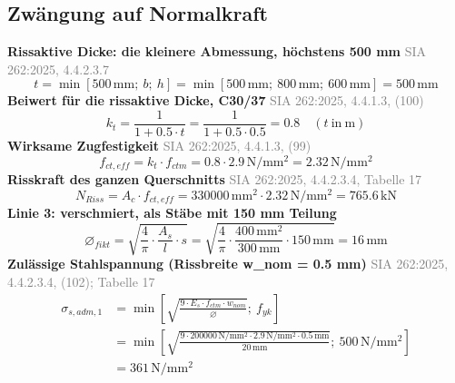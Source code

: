 \documentclass[11pt,a4paper]{article}
\newcommand{\normref}[1]{{\small\textcolor{gray}{#1}}}
\begin{document}
\subsection{Zwängung auf Normalkraft}
\noindent\textbf{Rissaktive Dicke: die kleinere Abmessung, höchstens 500 mm} \hfill \normref{SIA 262:2025, 4.4.2.3.7}
\begin{equation*}
t = \min\left[500\,\mathrm{mm};\ b;\ h\right] = \min\left[500\,\mathrm{mm};\ 800\,\mathrm{mm};\ 600\,\mathrm{mm}\right] = 500\,\mathrm{mm}
\end{equation*}
\noindent\textbf{Beiwert für die rissaktive Dicke, C30/37} \hfill \normref{SIA 262:2025, 4.4.1.3, (100)}
\begin{equation*}
k_t = \frac{1}{1 + 0.5 \cdot t} = \frac{1}{1 + 0.5 \cdot 0.5} = 0.8 \quad \left(t\ \text{in}\ \mathrm{m}\right)
\end{equation*}
\noindent\textbf{Wirksame Zugfestigkeit} \hfill \normref{SIA 262:2025, 4.4.1.3, (99)}
\begin{equation*}
f_{ct,eff} = k_t \cdot f_{ctm} = 0.8 \cdot 2.9\,\mathrm{N}/\mathrm{mm}^{2} = 2.32\,\mathrm{N}/\mathrm{mm}^{2}
\end{equation*}
\noindent\textbf{Risskraft des ganzen Querschnitts} \hfill \normref{SIA 262:2025, 4.4.2.3.4, Tabelle 17}
\begin{equation*}
N_{Riss} = A_c \cdot f_{ct,eff} = 330000\,\mathrm{mm}^{2} \cdot 2.32\,\mathrm{N}/\mathrm{mm}^{2} = 765.6\,\mathrm{kN}
\end{equation*}
\noindent\textbf{Linie 3: verschmiert, als Stäbe mit 150 mm Teilung}
\begin{equation*}
\varnothing_{fikt} = \sqrt{\frac{4}{\pi} \cdot \frac{A_s}{l} \cdot s} = \sqrt{\frac{4}{\pi} \cdot \frac{400\,\mathrm{mm}^{2}}{300\,\mathrm{mm}} \cdot 150\,\mathrm{mm}} = 16\,\mathrm{mm}
\end{equation*}
\noindent\textbf{Zulässige Stahlspannung (Rissbreite w\_nom = 0.5 mm)} \hfill \normref{SIA 262:2025, 4.4.2.3.4, (102); Tabelle 17}
\begin{equation*}
\begin{aligned}
  \sigma_{s,adm,1} &= \min\left[\sqrt{\frac{9 \cdot E_s \cdot f_{ctm} \cdot w_{nom}}{\varnothing}};\ f_{yk}\right] \\
  &= \min\left[\sqrt{\frac{9 \cdot 200000\,\mathrm{N}/\mathrm{mm}^{2} \cdot 2.9\,\mathrm{N}/\mathrm{mm}^{2} \cdot 0.5\,\mathrm{mm}}{20\,\mathrm{mm}}};\ 500\,\mathrm{N}/\mathrm{mm}^{2}\right] \\
  &= 361\,\mathrm{N}/\mathrm{mm}^{2}
\end{aligned}
\end{equation*}
\end{document}
